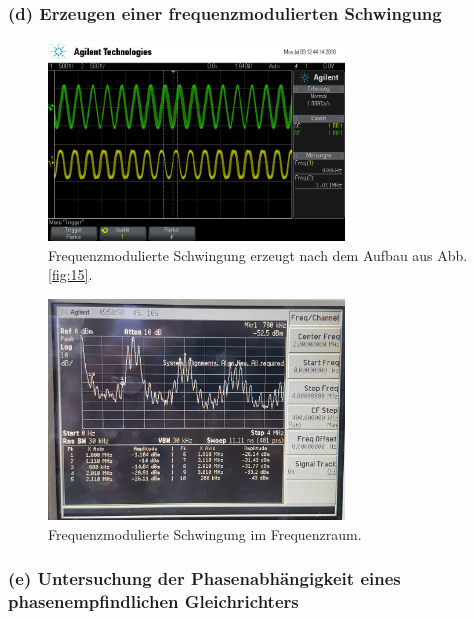\subsubsection{(d) Erzeugen einer frequenzmodulierten Schwingung}
\label{subsubsec:auswertung_d}

\begin{figure}
  \centering
  \includegraphics[width=0.7\textwidth]{osci/freq_mod.png}
  \caption{Frequenzmodulierte
  Schwingung erzeugt nach dem Aufbau aus Abb.\ref{fig:15}.}
  \label{fig:frequ_zeit}
\end{figure}


\begin{figure}
  \centering
  \includegraphics[width=0.7\textwidth]{spec/frequenzmodulation_bereich_fresh_cool.jpg}
  \caption{Frequenzmodulierte
Schwingung im Frequenzraum.}
\label{fig:diode_frequenz_gross}
\end{figure}




\subsubsection{(e) Untersuchung der Phasenabhängigkeit eines
phasenempfindlichen Gleichrichters}
\label{subsubsec:auswertung_e}

